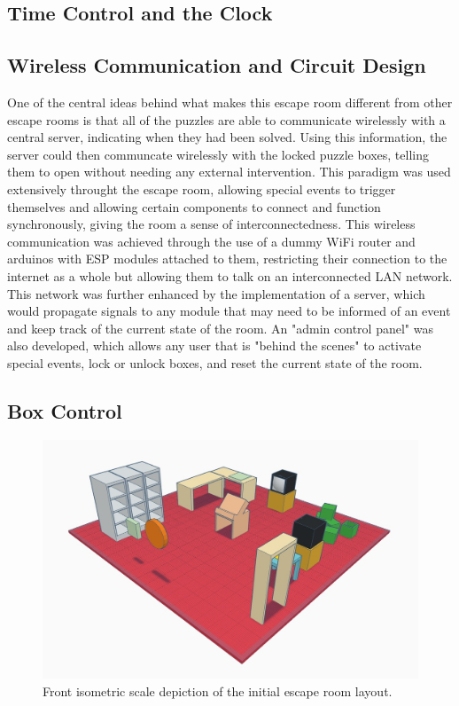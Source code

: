 \documentclass[conference]{IEEEtran}
\begin{document}
\subsection{Time Control and the Clock} %

\subsection{Wireless Communication and Circuit Design} %
One of the central ideas behind what makes this escape room different from other escape rooms is that all of the puzzles are able to communicate
wirelessly with a central server, indicating when they had been solved. Using this information, the server could then communcate wirelessly with
the locked puzzle boxes, telling them to open without needing any external intervention. This paradigm was used extensively throught the escape
room, allowing special events to trigger themselves and allowing certain components to connect and function synchronously, giving the room a 
sense of interconnectedness. This wireless communication was achieved through the use of a dummy WiFi router and arduinos with ESP modules
attached to them, restricting their connection to the internet as a whole but allowing them to talk on an interconnected LAN network.
\\
\indent This network was further enhanced by the implementation of a server, which would propagate signals to any module that may need to be informed
of an event and keep track of the current state of the room. An "admin control panel" was also developed, which allows any user that is "behind the
scenes" to activate special events, lock or unlock boxes, and reset the current state of the room.


\subsection{Box Control}

\begin{figure}[ht]
    \centering
    \includegraphics[width=0.90\columnwidth]{Images/EscapeRoomIsoFront.jpg}
    \caption{Front isometric scale depiction of the initial escape room layout.}
\end{figure}
\end{document}
